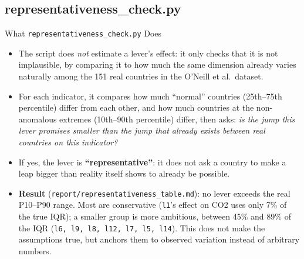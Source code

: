 \documentclass[11pt,aspectratio=169]{beamer}
\begin{document}
\subsection{representativeness\_check.py}
\begin{frame}{What \texttt{representativeness\_check.py} Does}
  \begin{itemize}
    \item The script does \emph{not} estimate a lever's effect: it only checks that it is \alert{not implausible}, by comparing it to how much the same dimension already varies naturally among the 151 real countries in the O'Neill et al.\ dataset.
    \item For each indicator, it compares how much ``normal'' countries (25th--75th percentile) differ from each other, and how much countries at the non-anomalous extremes (10th--90th percentile) differ, then asks: \emph{is the jump this lever promises smaller than the jump that already exists between real countries on this indicator?}
    \item If yes, the lever is \textbf{``representative''}: it does not ask a country to make a leap bigger than reality itself shows to already be possible.
    \item \textbf{Result} (\texttt{report/representativeness\_table.md}): no lever exceeds the real P10--P90 range. Most are \alert{conservative} (\texttt{l1}'s effect on CO2 uses only 7\% of the true IQR); a smaller group is more \alert{ambitious}, between 45\% and 89\% of the IQR (\texttt{l6, l9, l8, l12, l7, l5, l14}). This does not make the assumptions true, but anchors them to observed variation instead of arbitrary numbers.
  \end{itemize}
\end{frame}
\end{document}
